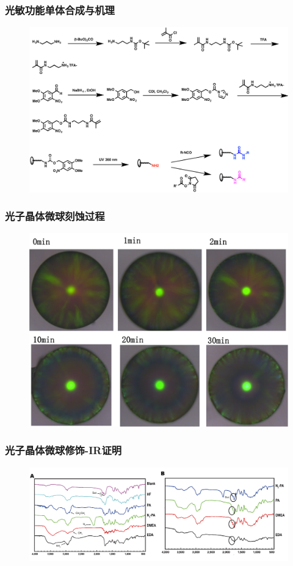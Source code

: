 \documentclass{beamer}
\begin{document}
\begin{frame}
  \frametitle{光敏功能单体合成与机理}
  \begin{figure}[htbp]
    \centering
    \includegraphics[width=0.95\linewidth]{figures/scheme-NVOC.png}
  \end{figure} 
\end{frame}

\begin{frame}
  \frametitle{光子晶体微球刻蚀过程}
  \begin{figure}
    \begin{center}
      \includegraphics[width=0.8\linewidth]{figures/ch3/Fig1A.png}
    \end{center}
  \end{figure}
\end{frame}

\begin{frame}
  \frametitle{光子晶体微球修饰-IR证明}
  \begin{figure}
    \begin{center}
      \includegraphics[width=\linewidth]{figures/ch3/IR.png}
    \end{center}
  \end{figure}
\end{frame}
\end{document}
